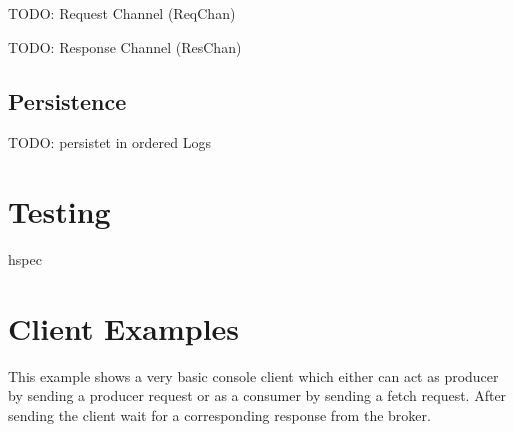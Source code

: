TODO: Request Channel (ReqChan)

TODO: Response Channel (ResChan)

\subsection{Persistence}
TODO: persistet in ordered Logs


 






\section{Testing}
hspec 

\section{Client Examples}
This example shows a very basic console client which either can act as producer
by sending a producer request or as a consumer by sending a fetch request. After
sending the client wait for a corresponding response from the broker.

